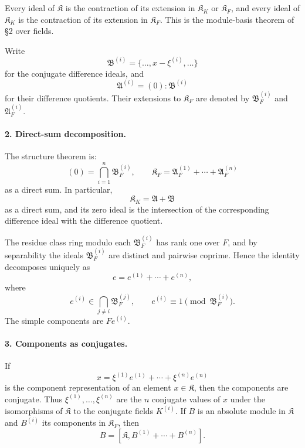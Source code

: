 \documentclass[11pt]{article}
\begin{document}
Every ideal of $\mathfrak K$ is the contraction of its extension in $\mathfrak K_K$ or $\mathfrak K_F$, and every ideal of $\mathfrak K_K$ is the contraction of its extension in $\mathfrak K_F$. This is the module-basis theorem of §2 over fields.

Write
\[
        \mathfrak B^{(i)}=\{\ldots,x-\xi^{(i)},\ldots\}
\]
for the conjugate difference ideals, and
\[
        \mathfrak A^{(i)}=(0):\mathfrak B^{(i)}
\]
for their difference quotients. Their extensions to $\mathfrak K_F$ are denoted by $\mathfrak B_F^{(i)}$ and $\mathfrak A_F^{(i)}$.

\paragraph{2. Direct-sum decomposition.}
The structure theorem is:
\[
        (0)=\bigcap_{i=1}^n \mathfrak B_F^{(i)},
        \qquad
        \mathfrak K_F=\mathfrak A_F^{(1)}+
        \cdots+\mathfrak A_F^{(n)}
\]
as a direct sum. In particular,
\[
        \mathfrak K_K=\mathfrak A+\mathfrak B
\]
as a direct sum, and its zero ideal is the intersection of the corresponding difference ideal with the difference quotient.

The residue class ring modulo each $\mathfrak B_F^{(i)}$ has rank one over $F$, and by separability the ideals $\mathfrak B_F^{(i)}$ are distinct and pairwise coprime. Hence the identity decomposes uniquely as
\[
        e=e^{(1)}+
        \cdots+e^{(n)},
\]
where
\[
        e^{(i)}\in\bigcap_{j\ne i}\mathfrak B_F^{(j)},
        \qquad
        e^{(i)}\equiv1\pmod {\mathfrak B_F^{(i)}}.
\]
The simple components are $Fe^{(i)}$.

\paragraph{3. Components as conjugates.}
If
\[
        x=\xi^{(1)}e^{(1)}+
        \cdots+\xi^{(n)}e^{(n)}
\]
is the component representation of an element $x\in\mathfrak K$, then the components are conjugate. Thus $\xi^{(1)},\ldots,\xi^{(n)}$ are the $n$ conjugate values of $x$ under the isomorphisms of $\mathfrak K$ to the conjugate fields $K^{(i)}$. If $B$ is an absolute module in $\mathfrak K$ and $B^{(i)}$ its components in $\mathfrak K_F$, then
\[
        B=[\mathfrak K,B^{(1)}+\cdots+B^{(n)}].
\]
\end{document}
